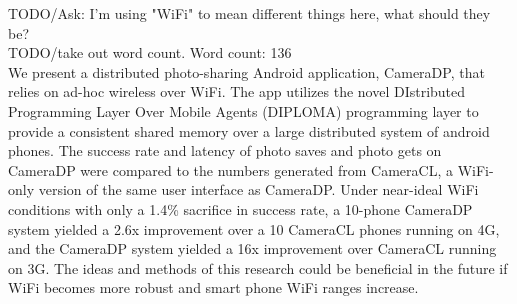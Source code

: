 TODO/Ask: I'm using "WiFi" to mean different things here, what should they be? \\
TODO/take out word count. Word count: 136 \\

We present a distributed photo-sharing Android application, CameraDP, that relies on ad-hoc wireless over WiFi. The app utilizes the novel DIstributed Programming Layer Over Mobile Agents (DIPLOMA) programming layer to provide a consistent shared memory over a large distributed system of android phones. The success rate and latency of photo saves and photo gets on CameraDP were compared to the numbers generated from CameraCL, a WiFi-only version of the same user interface as CameraDP. Under near-ideal WiFi conditions with only a 1.4\% sacrifice in success rate, a 10-phone CameraDP system yielded a 2.6x improvement over a 10 CameraCL phones running on 4G, and the CameraDP system yielded a 16x improvement over CameraCL running on 3G. The ideas and methods of this research could be beneficial in the future if WiFi becomes more robust and smart phone WiFi ranges increase.

